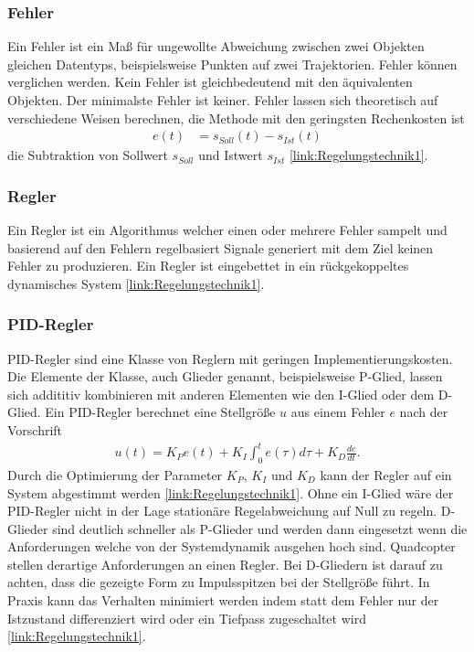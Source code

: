 \subsubsection{Fehler}
Ein Fehler ist ein Maß für ungewollte Abweichung zwischen zwei Objekten gleichen Datentyps, beispielsweise Punkten auf zwei Trajektorien. Fehler können verglichen werden. Kein Fehler ist gleichbedeutend mit den äquivalenten Objekten. Der minimalste Fehler ist keiner. Fehler lassen sich theoretisch auf verschiedene Weisen berechnen, die Methode mit den geringsten Rechenkosten ist 
\begin{align}
	e(t) &= s_{Soll}(t) - s_{Ist}(t)
\end{align}
die Subtraktion von Sollwert $s_{Soll}$ und Istwert $s_{Ist}$ \ref{link:Regelungstechnik1}.

\subsubsection{Regler}
Ein Regler ist ein Algorithmus welcher einen oder mehrere Fehler sampelt und basierend auf den Fehlern regelbasiert Signale generiert mit dem Ziel keinen Fehler zu produzieren. Ein Regler ist eingebettet in ein rückgekoppeltes dynamisches System \ref{link:Regelungstechnik1}.

\subsubsection{\label{pid:pid}PID-Regler}
PID-Regler sind eine Klasse von Reglern mit geringen Implementierungskosten.
Die Elemente der Klasse, auch Glieder genannt, beispielsweise P-Glied, lassen sich addititiv kombinieren mit anderen Elementen wie den I-Glied oder dem D-Glied.
Ein PID-Regler berechnet eine Stellgröße $u$ aus einem Fehler $e$ nach der Vorschrift
\label{pidregler}
\begin{align}
	u(t) = K_Pe(t) + K_I\int_0^t e(\tau)d\tau + K_D\frac{de}{dt}.
\end{align}
Durch die Optimierung der Parameter $K_P$, $K_I$ und $K_D$ kann der Regler auf ein System abgestimmt werden \ref{link:Regelungstechnik1}. Ohne ein I-Glied wäre der PID-Regler nicht in der Lage stationäre Regelabweichung auf Null zu regeln. D-Glieder sind deutlich schneller als P-Glieder und werden dann eingesetzt wenn die Anforderungen welche von der Systemdynamik ausgehen hoch sind. Quadcopter stellen derartige Anforderungen an einen Regler. Bei D-Gliedern ist darauf zu achten, dass die gezeigte Form zu Impulsspitzen bei der Stellgröße führt. In Praxis kann das Verhalten minimiert werden indem statt dem Fehler nur der Istzustand differenziert wird oder ein Tiefpass zugeschaltet wird \ref{link:Regelungstechnik1}. 

